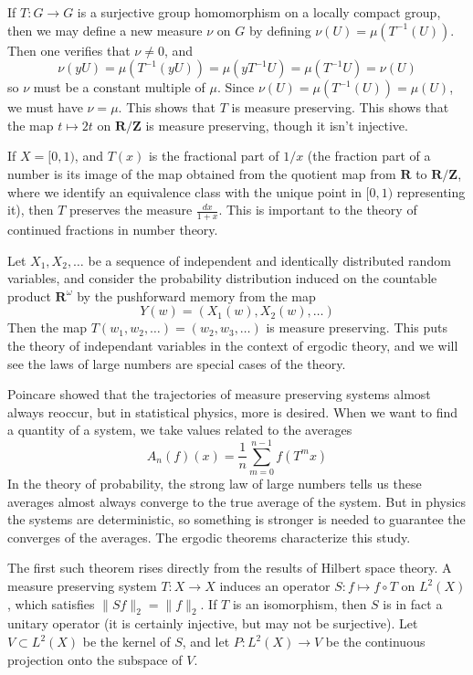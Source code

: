 \begin{example}
    If $T: G \to G$ is a surjective group homomorphism on a locally compact group, then we may define a new measure $\nu$ on $G$ by defining $\nu(U) = \mu(T^{-1}(U))$. Then one verifies that $\nu \neq 0$, and
    \[ \nu(yU) = \mu(T^{-1}(yU)) = \mu(yT^{-1}U) = \mu(T^{-1}U) = \nu(U) \]
    so $\nu$ must be a constant multiple of $\mu$. Since $\nu(U) = \mu(T^{-1}(U)) = \mu(U)$, we must have $\nu = \mu$. This shows that $T$ is measure preserving. This shows that the map $t \mapsto 2t$ on $\mathbf{R}/\mathbf{Z}$ is measure preserving, though it isn't injective.
\end{example}

\begin{example}
    If $X = [0,1)$, and $T(x)$ is the fractional part of $1/x$ (the fraction part of a number is its image of the map obtained from the quotient map from $\mathbf{R}$ to $\mathbf{R}/\mathbf{Z}$, where we identify an equivalence class with the unique point in $[0,1)$ representing it), then $T$ preserves the measure $\frac{dx}{1+x}$. This is important to the theory of continued fractions in number theory.
\end{example}

\begin{example}
    Let $X_1, X_2, \dots$ be a sequence of independent and identically distributed random variables, and consider the probability distribution induced on the countable product $\mathbf{R}^\omega$ by the pushforward memory from the map
    \[ Y(w) = (X_1(w),X_2(w), \dots) \]
    Then the map $T(w_1, w_2, \dots) = (w_2, w_3, \dots)$ is measure preserving. This puts the theory of independant variables in the context of ergodic theory, and we will see the laws of large numbers are special cases of the theory.
\end{example}

Poincare showed that the trajectories of measure preserving systems almost always reoccur, but in statistical physics, more is desired. When we want to find a quantity of a system, we take values related to the averages
%
\[ A_n(f)(x) = \frac{1}{n} \sum_{m = 0}^{n-1} f(T^m x) \]
%
In the theory of probability, the strong law of large numbers tells us these averages almost always converge to the true average of the system. But in physics the systems are deterministic, so something is stronger is needed to guarantee the converges of the averages. The ergodic theorems characterize this study.

The first such theorem rises directly from the results of Hilbert space theory. A measure preserving system $T:X \to X$ induces an operator $S: f \mapsto f \circ T$ on $L^2(X)$, which satisfies $\|Sf\|_2 = \| f \|_2$. If $T$ is an isomorphism, then $S$ is in fact a unitary operator (it is certainly injective, but may not be surjective). Let $V \subset L^2(X)$ be the kernel of $S$, and let $P: L^2(X) \to V$ be the continuous projection onto the subspace of $V$.


